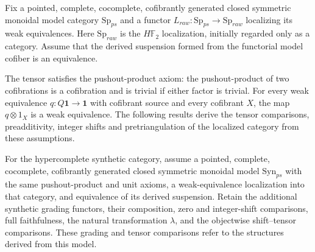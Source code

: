 \begin{definition}
\label{sem:AdamsSynthetic:point-set-model}
Fix a pointed, complete, cocomplete, cofibrantly generated closed symmetric
monoidal model category $\mathrm{Sp}_{ps}$ and a functor
$L_{raw}\colon\mathrm{Sp}_{ps}\to\mathrm{Sp}_{raw}$ localizing its weak
equivalences. Here $\mathrm{Sp}_{raw}$ is the $H\mathbb F_2$ localization, initially
regarded only as a category. Assume that the derived suspension formed
from the functorial model cofiber is an equivalence.

The tensor satisfies the pushout-product axiom: the pushout-product of
two cofibrations is a cofibration and is trivial if either factor is
trivial. For every weak equivalence $q\colon Q\mathbf{1}\to\mathbf{1}$
with cofibrant source and every cofibrant $X$, the map $q\otimes 1_X$
is a weak equivalence. The following results derive the tensor
comparisons, preadditivity, integer shifts and pretriangulation of the
localized category from these assumptions.

For the hypercomplete synthetic category, assume a
pointed, complete, cocomplete, cofibrantly generated closed symmetric
monoidal model $\mathrm{Syn}_{ps}$ with the same pushout-product and unit
axioms, a weak-equivalence localization into that category, and equivalence
of its derived suspension. Retain the additional synthetic grading
functors, their composition, zero and integer-shift comparisons, full
faithfulness, the natural transformation $\lambda$, and the objectwise
shift--tensor comparisons. These grading and tensor comparisons refer to the structures derived
from this model.
\end{definition}

